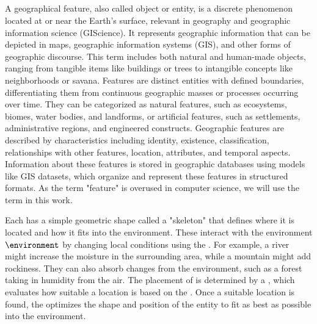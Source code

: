 \subsection{}
\label{sec:semantic-representation_environmental-objects}
A geographical feature, also called object or entity, is a discrete phenomenon located at or near the Earth's surface, relevant in geography and geographic information science (GIScience). It represents geographic information that can be depicted in maps, geographic information systems (GIS), and other forms of geographic discourse. This term includes both natural and human-made objects, ranging from tangible items like buildings or trees to intangible concepts like neighborhoods or savana. Features are distinct entities with defined boundaries, differentiating them from continuous geographic masses or processes occurring over time. They can be categorized as natural features, such as ecosystems, biomes, water bodies, and landforms, or artificial features, such as settlements, administrative regions, and engineered constructs. Geographic features are described by characteristics including identity, existence, classification, relationships with other features, location, attributes, and temporal aspects. Information about these features is stored in geographic databases using models like GIS datasets, which organize and represent these features in structured formats. As the term "feature" is overused in computer science, we will use the term  in this work.

Each  has a simple geometric shape called a "skeleton" that defines where it is located and how it fits into the environment.
These  interact with the environment $\environment$ by changing local conditions using the . For example, a river might increase the moisture in the surrounding area, while a mountain might add rockiness. They can also absorb changes from the environment, such as a forest taking in humidity from the air.
The placement of  is determined by a , which evaluates how suitable a location is based on the . Once a suitable location is found, the  optimizes the shape and position of the entity to fit as best as possible into the environment.



